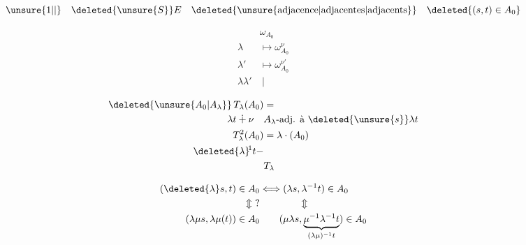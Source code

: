 \[
\unsure{1|\vert}\quad \deleted{\unsure{S}}E\quad\deleted{\text{\unsure{adjacence|adjacentes|adjacents}}}\quad\deleted{(s,t)\in A_0}
\]

\[
\begin{aligned}
&\omega_{A_0}\\
\lambda&\longmapsto\omega_{A_0}^\nu\\
\lambda'&\longmapsto\omega_{A_0}^{\nu'}\\
\lambda\lambda'&\ \vert
\end{aligned}
\]

\[
\begin{aligned}
\deleted{\unsure{A_0|A_\lambda}}\,T_\lambda(A_0)&=\\
\lambda t\dotplus\nu\quad&A_\lambda\text{-adj. à }\deleted{\unsure{s}}\lambda t\\
T_\lambda^2(A_0)&=\lambda\cdot(A_0)\\
\deleted{\lambda}\!{}^{1}t-&\\
&T_\lambda
\end{aligned}
\]

\[
\begin{aligned}
(\deleted{\lambda}s,t)\in A_0&\Longleftrightarrow(\lambda s,\lambda^{-1}t)\in A_0\\
\Updownarrow\ ?&\qquad\qquad\Updownarrow\\
(\lambda\mu s,\lambda\mu(t))\in A_0&\qquad(\mu\lambda s,\underset{(\lambda\mu)^{-1}t}{\underbrace{\mu^{-1}\lambda^{-1}t}})\in A_0
\end{aligned}
\]

